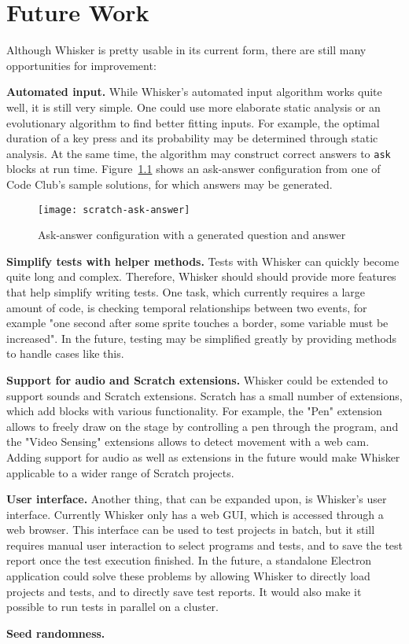 \chapter{Future Work}
\label{cha:future_work}

Although Whisker is pretty usable in its current form,
there are still many opportunities for improvement:
\parspace

\textbf{Automated input.}
While Whisker's automated input algorithm works quite well, it is still very simple.
One could use more elaborate static analysis or an evolutionary algorithm to find better fitting inputs.
For example, the optimal duration of a key press and its probability may be determined through static analysis.
At the same time, the algorithm may construct correct answers to \texttt{ask} blocks at run time.
Figure~\ref{fig:generated_ask_answer} shows an ask-answer configuration from one of Code Club's sample solutions,
for which answers may be generated.

\begin{figure}[htpb]
    \centering
    \texttt{[image: scratch-ask-answer]}
    \caption{Ask-answer configuration with a generated question and answer}
    \label{fig:generated_ask_answer}
\end{figure}


\textbf{Simplify tests with helper methods.}
Tests with Whisker can quickly become quite long and complex.
Therefore, Whisker should should provide more features that help simplify writing tests.
One task, which currently requires a large amount of code,
is checking temporal relationships between two events,
for example "one second after some sprite touches a border, some variable must be increased".
In the future, testing may be simplified greatly by providing methods to handle cases like this.
\parspace

\textbf{Support for audio and Scratch extensions.}
Whisker could be extended to support sounds and Scratch extensions.
Scratch has a small number of extensions, which add blocks with various functionality.
For example, the "Pen" extension allows to freely draw on the stage by controlling a pen through the program,
and the "Video Sensing" extensions allows to detect movement with a web cam.
Adding support for audio as well as extensions in the future would make Whisker applicable to a wider range of Scratch projects.
\parspace

\textbf{User interface.}
Another thing, that can be expanded upon, is Whisker's user interface.
Currently Whisker only has a web GUI, which is accessed through a web browser.
This interface can be used to test projects in batch, but it still requires manual user interaction to select programs and tests,
and to save the test report once the test execution finished.
In the future, a standalone Electron~\cite{electron} application could solve these problems by allowing Whisker to directly load projects and tests,
and to directly save test reports.
It would also make it possible to run tests in parallel on a cluster.
\parspace

\textbf{Seed randomness.}

